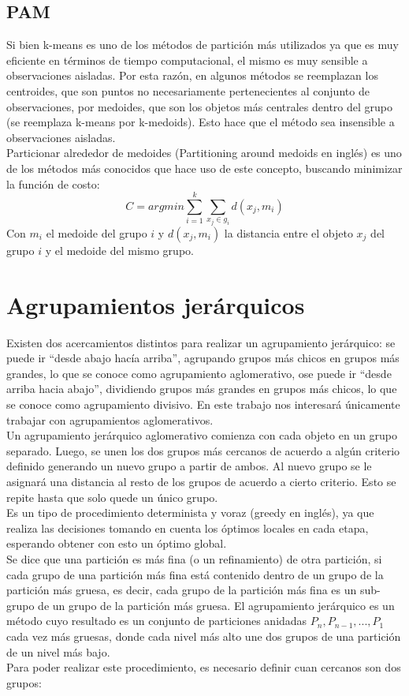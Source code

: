 \subsection{PAM}
Si bien k-means es uno de los métodos de partición más utilizados ya que es muy eficiente en términos de tiempo computacional, el mismo es muy sensible a observaciones aisladas. Por esta razón, en algunos métodos se reemplazan los centroides, que son puntos no necesariamente pertenecientes al conjunto de observaciones, por medoides, que son los objetos más centrales dentro del grupo (se reemplaza k-means por k-medoids). Esto hace que el método sea insensible a observaciones aisladas.\\
Particionar alrededor de medoides (Partitioning around medoids en inglés) es uno de los métodos más conocidos que hace uso de este concepto, buscando minimizar la función de costo:
\begin{equation}
	C = argmin\sum\limits_{i=1}^k \sum\limits_{x_j \in g_i} d(x_j, m_i)
\end{equation}
Con $m_i$ el medoide del grupo $i$ y $d(x_j, m_i)$ la distancia entre el objeto $x_j$ del grupo $i$ y el medoide del mismo grupo.
\cite{Park2009}\cite{Ibrahim2012}
\section{Agrupamientos jerárquicos}
Existen dos acercamientos distintos para realizar un agrupamiento jerárquico: se puede ir ``desde abajo hacía arriba'', agrupando grupos más chicos en grupos más grandes, lo que se conoce como agrupamiento aglomerativo, ose puede ir ``desde arriba hacia abajo'', dividiendo grupos más grandes en grupos más chicos, lo que se conoce como agrupamiento divisivo. En este trabajo nos interesará únicamente trabajar con agrupamientos aglomerativos.\\
Un agrupamiento jerárquico aglomerativo comienza con cada objeto en un grupo separado. Luego, se unen los dos grupos más cercanos de acuerdo a algún criterio definido generando un nuevo grupo a partir de ambos. Al nuevo grupo se le asignará una distancia al resto de los grupos de acuerdo a cierto criterio. Esto se repite hasta que solo quede un único grupo.\\
Es un tipo de procedimiento determinista y voraz (greedy en inglés), ya que realiza las decisiones tomando en cuenta los óptimos locales en cada etapa, esperando obtener con esto un óptimo global.\\
Se dice que una partición es más fina (o un refinamiento) de otra partición, si cada grupo de una partición más fina está contenido dentro de un grupo de la partición más gruesa, es decir, cada grupo de la partición más fina es un sub-grupo de un grupo de la partición más gruesa. El agrupamiento jerárquico es un método cuyo resultado es un conjunto de particiones anidadas $P_n, P_{n-1}, ..., P_1$ cada vez más gruesas, donde cada nivel más alto une dos grupos de una partición de un nivel más bajo.\\
Para poder realizar este procedimiento, es necesario definir cuan cercanos son dos grupos:
